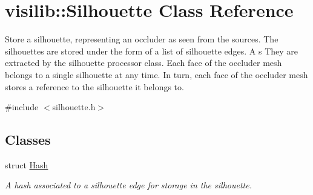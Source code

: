 \hypertarget{classvisilib_1_1_silhouette}{}\section{visilib\+::Silhouette Class Reference}
\label{classvisilib_1_1_silhouette}


Store a silhouette, representing an occluder as seen from the sources. The silhouettes are stored under the form of a list of silhouette edges. A s They are extracted by the silhouette processor class. Each face of the occluder mesh belongs to a single silhouette at any time. In turn, each face of the occluder mesh stores a reference to the silhouette it belongs to. 




{\ttfamily \#include $<$silhouette.\+h$>$}

\subsection*{Classes}
\begin{DoxyCompactItemize}
\item 
struct \mbox{\hyperlink{structvisilib_1_1_silhouette_1_1_hash}{Hash}}
\begin{DoxyCompactList}\small\item\em A hash associated to a silhouette edge for storage in the silhouette. \end{DoxyCompactList}\end{DoxyCompactItemize}
